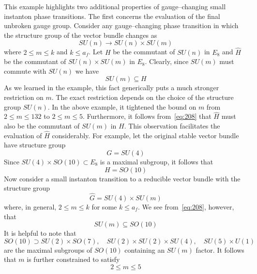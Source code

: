 \documentclass[a4paper,12pt]{article}
\numberwithin{equation}{section}
\theoremstyle{plain}
\begin{document}
This example highlights two additional properties of gauge--changing small
instanton phase transitions. The first concerns the evaluation of the final
unbroken gauge group. Consider any gauge--changing phase transition in which
the structure group of the vector bundle changes as
\begin{equation}
SU(n) \longrightarrow SU(n) \times SU(m)
\label{eq:207}
\end{equation}
where $2 \leq m \leq k$ and $k \leq a_{f}$. Let $H$ be the commutant of
$SU(n)$ in $E_{8}$ and $\widehat{H}$ be the commutant of $SU(n) \times SU(m)$
in $E_{8}$.  Clearly, since $SU(m)$ must commute with $SU(n)$ we have
\begin{equation}
SU(m) \subseteq H 
\label{eq:208}
\end{equation}
As we learned in the example, this fact generically puts a much stronger 
restriction on $m$. The exact restriction depends on the choice of the
structure group $SU(n)$. In the above example, it tightened the bound on $m$
from $2 \leq m \leq 132$ to  $2 \leq m \leq 5$. Furthermore, it follows
from~\eqref{eq:208} that $\widehat{H}$ must also be the commutant of $SU(m)$
in $H$. This observation facilitates the evaluation of $\widehat{H}$
considerably. For example, let the original stable vector bundle have 
structure group
\begin{equation}
G=SU(4)
\label{eq:209}
\end{equation}
Since $SU(4) \times SO(10) \subset E_{8}$ is a maximal subgroup, it follows
that
\begin{equation}
H=SO(10)
\label{eq:210}
\end{equation}
Now consider a small instanton transition to a reducible vector bundle with
the structure group
\begin{equation}
\widehat{G}=SU(4) \times SU(m)
\label{eq:211}
\end{equation}
where, in general, $2 \leq m \leq k$ for some $k \leq a_{f}$. We see
from~\eqref{eq:208}, however, that
\begin{equation}
SU(m) \subseteq SO(10)
\label{eq:212}
\end{equation}
It is helpful to note that
\begin{equation}
SO(10) \supset SU(2) \times SO(7), \quad SU(2) \times SU(2) \times SU(4),
\quad SU(5) \times U(1)
\label{eq:213}
\end{equation}
are the maximal subgroups of $SO(10)$ containing an $SU(m)$ factor. It follows
that $m$ is further constrained to satisfy
\begin{equation}
2 \leq m \leq 5
\label{eq:214}
\end{equation}
\end{document}
